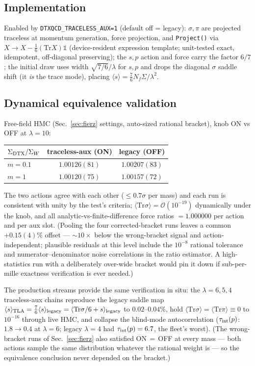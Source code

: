 \documentclass[11pt]{article}
\newcommand{\Tr}{\mathrm{Tr}}
\newcommand{\Sig}{\Sigma}
\begin{document}
\subsection{Implementation}

Enabled by \texttt{DTXQCD\_TRACELESS\_AUX=1} (default off = legacy):
$\sigma,\pi$ are projected traceless at momentum generation, force
projection, and \texttt{Project()} via
$X\to X-\tfrac16(\Tr X)\mathbb{1}$ (device-resident expression template;
unit-tested exact, idempotent, off-diagonal preserving); the $s,p$ action
and force carry the factor $6/7$; the initial draw uses width
$\sqrt{7/6}/\lambda$ for $s,p$ and drops the diagonal $\sigma$ saddle shift
(it \emph{is} the trace mode), placing
$\langle s\rangle=\tfrac76 N_{f}\Sig/\lambda^{2}$.

\subsection{Dynamical equivalence validation}

Free-field HMC (Sec.~\ref{sec:fierz} settings, auto-sized rational
bracket), knob ON vs OFF at $\lambda=10$:
\begin{center}
\begin{tabular}{lcc}
\toprule
$\Sig_{\rm DTX}/\Sig_{W}$ & traceless-aux (ON) & legacy (OFF)\\
\midrule
$m=0.1$ & $1.00126(81)$ & $1.00207(83)$\\
$m=1$   & $1.00120(75)$ & $1.00157(72)$\\
\bottomrule
\end{tabular}
\end{center}
The two actions agree with each other ($\le0.7\sigma$ per mass) and each
run is consistent with unity by the test's criteria;
$\langle\Tr\sigma\rangle=\mathcal{O}(10^{-19})$ dynamically under the knob,
and all analytic-vs-finite-difference force ratios $=1.000000$ per action
and per aux slot.  (Pooling the four corrected-bracket runs leaves a
common $+0.15(4)\%$ offset --- $\sim\!10\times$ below the wrong-bracket
signal and action-independent; plausible residuals at this level include
the $10^{-8}$ rational tolerance and numerator--denominator noise
correlations in the ratio estimator.  A high-statistics run with a
deliberately over-wide bracket would pin it down if sub-per-mille
exactness verification is ever needed.)

The production streams provide the same verification in situ: the
$\lambda=6,5,4$ traceless-aux chains reproduce the legacy saddle map
$\langle s\rangle_{\rm TLA}=\tfrac76\langle s\rangle_{\rm legacy}
=\langle \Tr\sigma/6+s\rangle_{\rm legacy}$ to $0.02$--$0.04\%$, hold
$\langle\Tr\sigma\rangle=\langle\Tr\pi\rangle\equiv0$ to $10^{-16}$
through live HMC, and collapse the blind-mode autocorrelation
($\tau_{\rm int}(p)$: $1.8\to0.4$ at $\lambda=6$; legacy $\lambda=4$ had
$\tau_{\rm int}(p)=6.7$, the fleet's worst).  (The wrong-bracket runs of
Sec.~\ref{sec:fierz} also satisfied ON$\,=\,$OFF at every mass --- both
actions sample the same distribution whatever the rational weight is ---
so the equivalence conclusion never depended on the bracket.)
\end{document}
